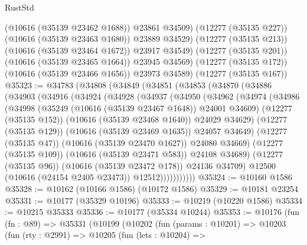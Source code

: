 \begin{lexlean}{RustStd}
\begin{coremodule}
              (@10616 (@35139 @23462 @1688))
              @23861
              @34509)
            (@12277 (@35135 @227))
            (@10616 (@35139 @23463 @1680))
            @23889
            @34529)
          (@12277 (@35135 @213))
          (@10616 (@35139 @23464 @1672))
          @23917
          @34549)
        (@12277 (@35135 @201))
        (@10616 (@35139 @23465 @1664))
        @23945
        @34569)
      (@12277 (@35135 @172))
      (@10616 (@35139 @23466 @1656))
      @23973
      @34589)
    (@12277 (@35135 @167))
@35323 := @34783
    (@34808
      (@34849
        (@34851
          (@34853
            (@34870
              (@34886
                (@34903
                  (@34916
                    (@34924
                      (@34928
                        (@34937
                          (@34950
                            (@34962
                              (@34974
                                (@34986
                                  (@34998
                                    (@35249 (@10616 (@35139 @23467 @1648)) @24001 @34609)
                                    (@12277 (@35135 @152))
                                    (@10616 (@35139 @23468 @1640))
                                    @24029
                                    @34629)
                                  (@12277 (@35135 @129))
                                  (@10616 (@35139 @23469 @1635))
                                  @24057
                                  @34649)
                                (@12277 (@35135 @47))
                                (@10616 (@35139 @23470 @1627))
                                @24080
                                @34669)
                              (@12277 (@35135 @109))
                              (@10616 (@35139 @23471 @583))
                              @24108
                              @34689)
                            (@12277 (@35135 @96))
                            (@10616 (@35139 @23472 @178))
                            @24136
                            @34709)
                          @12500
                          (@10616 (@24154 @2405 @23473))
                          @12512)))))))))))
@35324 := @10160 @1586
@35328 := @10162 (@10166 @1586) (@10172 @1586)
@35329 := @10181 @23254
@35331 := @10177 (@35329 @10196)
@35333 := @10219 (@10220 @1586)
@35334 := @10215 @35333
@35336 := @10177 (@35334 @10244)
@35353 := @10176
    (fun (fn : @89) =>
    @35331
      (@10199
        (@10202
          (fun (params : @10201) =>
          @10203
            (fun (rty : @2991) =>
            @10205
              (fun (lets : @10204) =>

\end{coremodule}
\end{lexlean}
